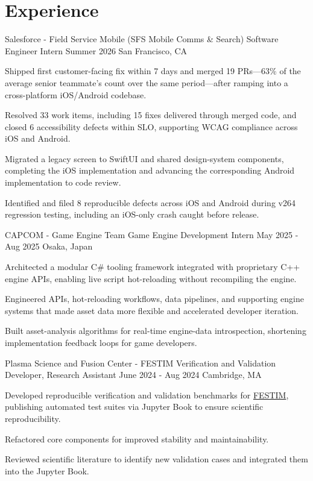 \section{Experience}
\resumeSubHeadingListStart
\ifdefined\showSalesforceExperience
\resumeExp
{Salesforce - Field Service Mobile (SFS Mobile Comms \& Search)}
{Software Engineer Intern}
{Summer 2026}
{San Francisco, CA}
\resumeItemListStart
\item[$\bullet$] Shipped first customer-facing fix within 7 days and merged 19 PRs---63\% of the average senior teammate's count over the same period---after ramping into a cross-platform iOS/Android codebase.
\item[$\bullet$] Resolved 33 work items, including 15 fixes delivered through merged code, and closed 6 accessibility defects within SLO, supporting WCAG compliance across iOS and Android.
\item[$\bullet$] Migrated a legacy screen to SwiftUI and shared design-system components, completing the iOS implementation and advancing the corresponding Android implementation to code review.
\item[$\bullet$] Identified and filed 8 reproducible defects across iOS and Android during v264 regression testing, including an iOS-only crash caught before release.
\resumeItemListEnd
\fi

\ifdefined\showCapcomExperience
\resumeExp
{CAPCOM - Game Engine Team}
{Game Engine Development Intern}
{May 2025 - Aug 2025}
{Osaka, Japan}
\resumeItemListStart
\item[$\bullet$] Architected a modular C\# tooling framework integrated with proprietary C++ engine APIs, enabling live script hot-reloading without recompiling the engine.
\item[$\bullet$] Engineered APIs, hot-reloading workflows, data pipelines, and supporting engine systems that made asset data more flexible and accelerated developer iteration.
\item[$\bullet$] Built asset-analysis algorithms for real-time engine-data introspection, shortening implementation feedback loops for game developers.
\resumeItemListEnd
\fi

\ifdefined\showFESTIMResearch
\resumeExp
{Plasma Science and Fusion Center - FESTIM}
{Verification and Validation Developer, Research Assistant}
{June 2024 - Aug 2024}
{Cambridge, MA}
\resumeItemListStart
\item[$\bullet$] Developed reproducible verification and validation benchmarks for \href{https://festim.readthedocs.io/}{FESTIM}, publishing automated test suites via Jupyter Book to ensure scientific reproducibility.
\item[$\bullet$] Refactored core components for improved stability and maintainability.
\item[$\bullet$] Reviewed scientific literature to identify new validation cases and integrated them into the Jupyter Book.
\resumeItemListEnd
\fi

